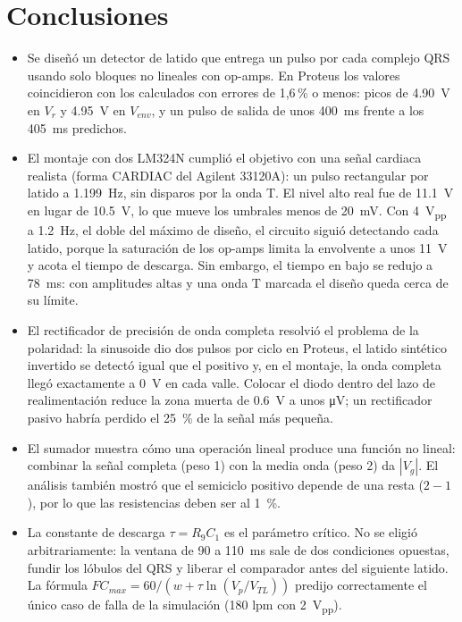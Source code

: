 \documentclass[11pt,letterpaper]{article}
\newcommand{\Vg}{V_g}
\newcommand{\Vr}{V_r}
\newcommand{\Venv}{V_{env}}
\newcommand{\VTL}{V_{TL}}
\begin{document}
\section{Conclusiones}
\begin{itemize}
  \item Se diseñó un detector de latido que entrega un pulso por cada complejo QRS usando solo bloques no lineales con op-amps. En Proteus los valores coincidieron con los calculados con errores de 1,6\,\% o menos: picos de \SI{4,90}{V} en $\Vr$ y \SI{4,95}{V} en $\Venv$, y un pulso de salida de unos \SI{400}{ms} frente a los \SI{405}{ms} predichos.
  \item El montaje con dos LM324N cumplió el objetivo con una señal cardiaca realista (forma CARDIAC del Agilent 33120A): un pulso rectangular por latido a \SI{1,199}{Hz}, sin disparos por la onda T. El nivel alto real fue de \SI{11,1}{V} en lugar de \SI{10,5}{V}, lo que mueve los umbrales menos de \SI{20}{mV}. Con \SI{4}{V_{pp}} a \SI{1,2}{Hz}, el doble del máximo de diseño, el circuito siguió detectando cada latido, porque la saturación de los op-amps limita la envolvente a unos \SI{11}{V} y acota el tiempo de descarga. Sin embargo, el tiempo en bajo se redujo a \SI{78}{ms}: con amplitudes altas y una onda T marcada el diseño queda cerca de su límite.
  \item El rectificador de precisión de onda completa resolvió el problema de la polaridad: la sinusoide dio dos pulsos por ciclo en Proteus, el latido sintético invertido se detectó igual que el positivo y, en el montaje, la onda completa llegó exactamente a \SI{0}{V} en cada valle. Colocar el diodo dentro del lazo de realimentación reduce la zona muerta de \SI{0,6}{V} a unos \si{\micro V}; un rectificador pasivo habría perdido el \SI{25}{\percent} de la señal más pequeña.
  \item El sumador muestra cómo una operación lineal produce una función no lineal: combinar la señal completa (peso 1) con la media onda (peso 2) da $|\Vg|$. El análisis también mostró que el semiciclo positivo depende de una resta ($2-1$), por lo que las resistencias deben ser al \SI{1}{\percent}.
  \item La constante de descarga $\tau=R_9C_1$ es el parámetro crítico. No se eligió arbitrariamente: la ventana de 90 a \SI{110}{ms} sale de dos condiciones opuestas, fundir los lóbulos del QRS y liberar el comparador antes del siguiente latido. La fórmula $FC_{max}=60/(w+\tau\ln(V_p/\VTL))$ predijo correctamente el único caso de falla de la simulación (180 lpm con \SI{2}{V_{pp}}).

\end{itemize}
\end{document}

